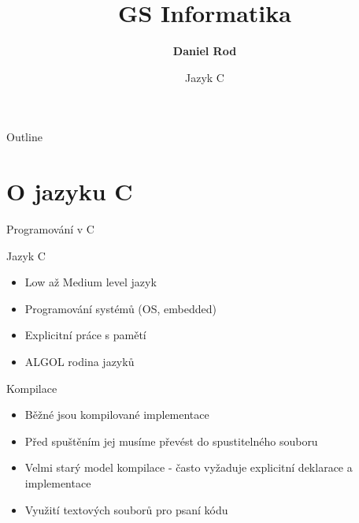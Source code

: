 \documentclass[9pt]{beamer}
\title[Informatika]{GS Informatika} %
\author[]{ \textbf{\Large Daniel Rod}} %
\date{Jazyk C}
\begin{document}
\frame[plain]{\titlepage}
\AddToShipoutPictureFG{
    \put(\LenToUnit{.92\paperwidth},
    \LenToUnit{.185\paperheight})
    {\vtop{{\null}}}}


\begin{frame}{Outline}
  \tableofcontents
\end{frame}

\section{O jazyku C}

\begin{frame}{Programování v C}

\begin{block}{Jazyk C}
\begin{itemize}
    \item Low až Medium level jazyk
    \item Programování systémů (OS, embedded)
    \item Explicitní práce s pamětí
    \item ALGOL rodina jazyků
\end{itemize}
\end{block}

\pause

\begin{block}{Kompilace}
\begin{itemize}
    \item Běžné jsou kompilované implementace
    \item Před spuštěním jej musíme převést
    do spustitelného souboru
    \item Velmi starý model kompilace - často vyžaduje explicitní deklarace a implementace
    \item Využití textových souborů pro psaní kódu
\end{itemize}
\end{block}

\end{frame}
\end{document}
